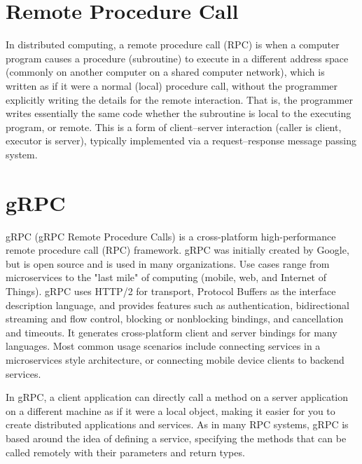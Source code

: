 \section{Remote Procedure Call}
	In distributed computing, a remote procedure call (RPC) \cite{rpc} is when a computer program causes a procedure (subroutine) to execute in a different address space 
	(commonly on another computer on a shared computer network), which is written as if it were a normal (local) procedure call, without the programmer 
	explicitly writing the details for the remote interaction. That is, the programmer writes essentially the same code whether the subroutine is local to 
	the executing program, or remote.
	This is a form of client–server interaction (caller is client, executor is server), typically implemented via a request–response message passing system.

\section{gRPC}
	gRPC (gRPC Remote Procedure Calls) \cite{grpcwiki} is a cross-platform high-performance remote procedure call (RPC) framework. 
	gRPC was initially created by Google, but is open source and is used in many organizations. 
	Use cases range from microservices to the "last mile" of computing (mobile, web, and Internet of Things). 
	gRPC uses HTTP/2 for transport, Protocol Buffers as the interface description language, and provides features such as authentication,
	bidirectional streaming and flow control, blocking or nonblocking bindings, and cancellation and timeouts. 
	It generates cross-platform client and server bindings for many languages. Most common usage scenarios include connecting services in a microservices 
	style architecture, or connecting mobile device clients to backend services.

	In gRPC, a client application can directly call a method on a server application on a different machine as if it were a local object, 
	making it easier for you to create distributed applications and services. As in many RPC systems, gRPC is based around the idea of 
	defining a service, specifying the methods that can be called remotely with their parameters and return types. \cite{grpcspec}
	
